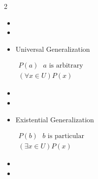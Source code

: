 \documentclass{article}
\begin{document}
\begin{multicols}{2}
\begin{itemize}
			$\begin{array}{l}
				 (\exists x\in U)P(x)\\\hline
					P(b)\mbox{  $b$ is particular}
			\end{array}$
			\item[]
			\item[]

			\item Universal Generalization

			$\begin{array}{l}
				 P(a)\mbox{ $a$ is arbitrary}\\\hline
				 (\forall x\in U)P(x)
			\end{array}$
			\item[]
			\item[]


			\item Existential Generalization

			$\begin{array}{l}
				 P(b)\mbox{  $b$ is particular}
				 \\\hline
				 (\exists x\in U)P(x)
			\end{array}$
			\item[]
			\item[]

		\end{itemize}
	\end{multicols}
\end{document}
